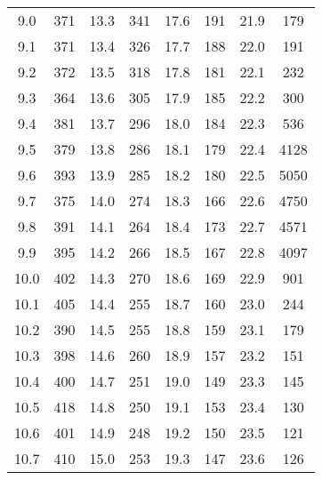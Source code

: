 \begin{table}[H]
\begin{tabular}{S[table-format=2.1] c | S[table-format=2.1] c | S[table-format=2.1] c | S[table-format=2.1] c}
\num{9.0}  & \num{371}  &   \num{13.3} & \num{341}  &   \num{17.6} & \num{191}  &   \num{21.9} & \num{179}  \\
\num{9.1}  & \num{371}  &   \num{13.4} & \num{326}  &   \num{17.7} & \num{188}  &   \num{22.0} & \num{191}  \\
\num{9.2}  & \num{372}  &   \num{13.5} & \num{318}  &   \num{17.8} & \num{181}  &   \num{22.1} & \num{232}  \\
\num{9.3}  & \num{364}  &   \num{13.6} & \num{305}  &   \num{17.9} & \num{185}  &   \num{22.2} & \num{300}  \\
\num{9.4}  & \num{381}  &   \num{13.7} & \num{296}  &   \num{18.0} & \num{184}  &   \num{22.3} & \num{536}  \\
\num{9.5}  & \num{379}  &   \num{13.8} & \num{286}  &   \num{18.1} & \num{179}  &   \num{22.4} & \num{4128} \\
\num{9.6}  & \num{393}  &   \num{13.9} & \num{285}  &   \num{18.2} & \num{180}  &   \num{22.5} & \num{5050} \\
\num{9.7}  & \num{375}  &   \num{14.0} & \num{274}  &   \num{18.3} & \num{166}  &   \num{22.6} & \num{4750} \\
\num{9.8}  & \num{391}  &   \num{14.1} & \num{264}  &   \num{18.4} & \num{173}  &   \num{22.7} & \num{4571} \\
\num{9.9}  & \num{395}  &   \num{14.2} & \num{266}  &   \num{18.5} & \num{167}  &   \num{22.8} & \num{4097} \\
\num{10.0} & \num{402}  &   \num{14.3} & \num{270}  &   \num{18.6} & \num{169}  &   \num{22.9} & \num{901}  \\
\num{10.1} & \num{405}  &   \num{14.4} & \num{255}  &   \num{18.7} & \num{160}  &   \num{23.0} & \num{244}  \\
\num{10.2} & \num{390}  &   \num{14.5} & \num{255}  &   \num{18.8} & \num{159}  &   \num{23.1} & \num{179}  \\
\num{10.3} & \num{398}  &   \num{14.6} & \num{260}  &   \num{18.9} & \num{157}  &   \num{23.2} & \num{151}  \\
\num{10.4} & \num{400}  &   \num{14.7} & \num{251}  &   \num{19.0} & \num{149}  &   \num{23.3} & \num{145}  \\
\num{10.5} & \num{418}  &   \num{14.8} & \num{250}  &   \num{19.1} & \num{153}  &   \num{23.4} & \num{130}  \\
\num{10.6} & \num{401}  &   \num{14.9} & \num{248}  &   \num{19.2} & \num{150}  &   \num{23.5} & \num{121}  \\
\num{10.7} & \num{410}  &   \num{15.0} & \num{253}  &   \num{19.3} & \num{147}  &   \num{23.6} & \num{126}  \\

\end{tabular}
\end{table}
